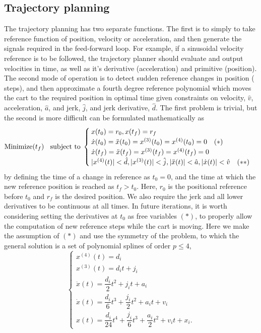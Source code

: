 \documentclass{article}
\begin{document}
\subsection{Trajectory planning}
The trajectory planning has two separate functions. The first is to simply to take reference function of position, velocity or acceleration, and then generate the signals required in the feed-forward loop. For example, if a sinusoidal velocity reference is to be followed, the trajectory planner should evaluate and output velocities in time, as well as it's derivative (acceleration) and primitive (position). The second mode of operation is to detect sudden reference changes in position ( steps), and then approximate a fourth degree reference polynomial which moves the cart to the required position in optimal time given constraints on velocity, $\hat{v}$, acceleration, $\hat{a}$, and jerk, $\hat{j}$, and jerk derivative, $\hat{d}$. The first problem is trivial, but the second is more difficult can be formulated mathematically as
\begin{equation}\label{eq:optProb}
\text{Minimize}(t_f)\;\;\text{ subject to}\;\;\\
\begin{cases}
x(t_0) = r_0, x(t_f) = r_f\\
\dot{x}(t_0) = \ddot{x}(t_0) = x^{(3)}(t_0) = x^{(4)}(t_0)=0\quad (*)\\
\dot{x}(t_f) = \ddot{x}(t_f) = x^{(3)}(t_f) = x^{(4)}(t_f) = 0 \\
|x^{(4)}(t)|<\hat{d},|x^{(3)}(t)| < \hat{j}, |\ddot{x}(t)|<\hat{a}, |\dot{x}(t)| <\hat{v} \quad(**)\\
\end{cases}
\end{equation}
by defining the time of a change in reference as $t_0 = 0$, and the time at which the new reference position is reached as $t_f > t_0$. Here, $r_0$ is the positional reference before $t_0$ and $r_f$ is the desired position. We also require the jerk and all lower derivatives to be continuous at all times. In future iterations, it is worth considering setting the derivatives at $t_0$ as free variables $(*)$, to properly allow the computation of new reference steps while the cart is moving. Here we make the assumption of $(*)$ and use the symmetry of the problem, to which the general solution is a set of polynomial splines of order $p\leq4$,
\begin{equation}\label{eq:gensol}
\begin{cases}
x^{(4)}(t) = d_i\\
x^{(3)}(t) =  d_it+j_i\\
\ddot{x}(t) = \dfrac{{d_i}}{2}t^2 + {j_i}t + a_i\\
\dot{x}(t) = \dfrac{{d_i}}{6}t^3 + \dfrac{{j_i}}{2}t^2 + {a_i}t + v_i\\
x(t) = \dfrac{{d_i}}{24}t^4 + \dfrac{{j_i}}{6}t^3 + \dfrac{{a_i}}{2}t^2 + {v_i}t + x_i.
\end{cases}
\end{equation}
\end{document}
